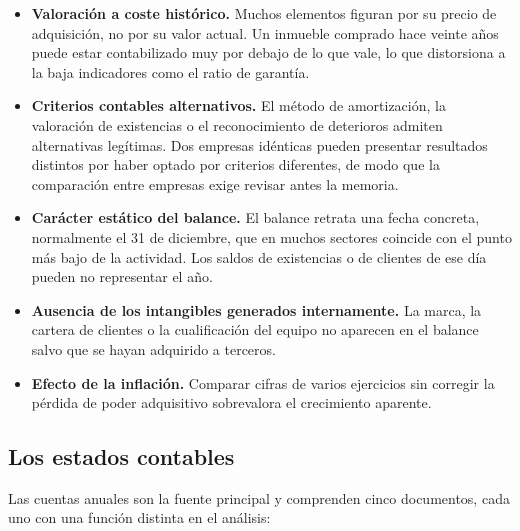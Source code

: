 \documentclass[12pt]{book} %
\providecommand{\tightlist}{%
  \setlength{\itemsep}{0pt}\setlength{\parskip}{0pt}}
\begin{document}
\begin{itemize}
\tightlist
\item
  \textbf{Valoración a coste histórico.} Muchos elementos figuran por su
  precio de adquisición, no por su valor actual. Un inmueble comprado
  hace veinte años puede estar contabilizado muy por debajo de lo que
  vale, lo que distorsiona a la baja indicadores como el ratio de
  garantía.
\item
  \textbf{Criterios contables alternativos.} El método de amortización,
  la valoración de existencias o el reconocimiento de deterioros admiten
  alternativas legítimas. Dos empresas idénticas pueden presentar
  resultados distintos por haber optado por criterios diferentes, de
  modo que la comparación entre empresas exige revisar antes la memoria.
\item
  \textbf{Carácter estático del balance.} El balance retrata una fecha
  concreta, normalmente el 31 de diciembre, que en muchos sectores
  coincide con el punto más bajo de la actividad. Los saldos de
  existencias o de clientes de ese día pueden no representar el año.
\item
  \textbf{Ausencia de los intangibles generados internamente.} La marca,
  la cartera de clientes o la cualificación del equipo no aparecen en el
  balance salvo que se hayan adquirido a terceros.
\item
  \textbf{Efecto de la inflación.} Comparar cifras de varios ejercicios
  sin corregir la pérdida de poder adquisitivo sobrevalora el
  crecimiento aparente.
\end{itemize}

\hypertarget{los-estados-contables}{%
\subsection{Los estados contables}\label{los-estados-contables}}

Las cuentas anuales son la fuente principal y comprenden cinco
documentos, cada uno con una función distinta en el análisis:
\end{document}
